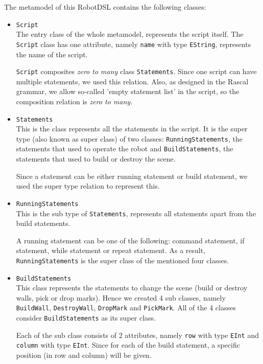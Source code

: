 \documentclass[a4paper, 11pt]{article}
\begin{document}
The metamodel of this RobotDSL contains the following classes:
\begin{itemize}
\item \texttt{Script}\\
The entry class of the whole metamodel, represents the script itself. The \texttt{Script} class has one attribute, namely \texttt{name} with type \texttt{EString}, represents the name of the script. \bigbreak

\texttt{Script} composites \textit{zero to many} class \texttt{Statements}. Since one script can have multiple statements, we used this relation. Also, as designed in the Rascal grammar, we allow so-called 'empty statement list' in the script, so the composition relation is \textit{zero to many}. 

\item \texttt{Statements}\\
This is the class represents all the statements in the script. It is the super type (also known as super class) of two classes: \texttt{RunningStatements}, the statements that used to operate the robot and \texttt{BuildStatements}, the statements that used to build or destroy the scene. \bigbreak

Since a statement can be either running statement or build statement, we used the super type relation to represent this. 

\item \texttt{RunningStatements}\\
This is the sub type of \texttt{Statements}, represents all statements apart from the build statements. \bigbreak

A running statement can be one of the following: command statement, if statement, while statement or repeat statement. As a result, \texttt{RunningStatements} is the super class of the mentioned four classes. 

\item \texttt{BuildStatements} \\
This class represents the statements to change the scene (build or destroy walls, pick or drop marks). Hence we created 4 sub classes, namely \texttt{BuildWall}, \texttt{DestroyWall}, \texttt{DropMark} and \texttt{PickMark}. All of the 4 classes consider \texttt{BuildStatements} as its super class. \bigbreak

Each of the sub class consists of 2 attributes, namely \texttt{row} with type \texttt{EInt} and \texttt{column} with type \texttt{EInt}. Since for each of the build statement, a specific position (in row and column) will be given. 


\end{itemize}
\end{document}
